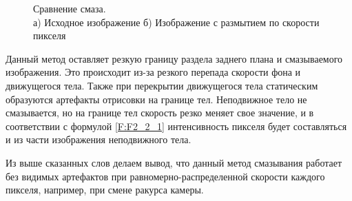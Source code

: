\begin{figure}[h]
    \centering
    \begin{minipage}[h]{0.49\linewidth}
    \end{minipage}
    \hfill
    \begin{minipage}[h]{0.49\linewidth}
    \end{minipage}
    \caption{Сравнение смаза. \\ а) Исходное изображение б) Изображение с размытием по скорости пикселя}
    \label{fig:pixel_blur}
\end{figure} 

\par
Данный метод оставляет резкую границу раздела заднего плана и смазываемого изображения. Это происходит из-за резкого перепада скорости фона и движущегося тела. Также при перекрытии движущегося тела статическим образуются артефакты отрисовки на границе тел. Неподвижное тело не смазывается, но на границе тел скорость резко меняет свое значение, и в соответствии с формулой \eqref{F:F2_2_1} интенсивность пикселя будет составляться и из части изображения неподвижного тела.
\par
Из выше сказанных слов делаем вывод, что данный метод смазывания работает без видимых артефактов  при равномерно-распределенной скорости каждого пикселя, например, при смене ракурса камеры.

